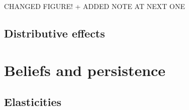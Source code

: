 \documentclass[12pt]{article} %
\providecommand{\DIFaddbegin}{} %
\providecommand{\DIFaddend}{} %
\newcommand{\DIFaddincludegraphics}[2][]{{\color{blue}\fbox{\DIFOincludegraphics[#1]{#2}}}} %
\DeclareRobustCommand{\DIFaddbegin}{\DIFOaddbegin \let\includegraphics\DIFaddincludegraphics} %
\DeclareRobustCommand{\DIFaddend}{\DIFOaddend \let\includegraphics\DIFOincludegraphics} %
\begin{document}
\begin{appendices}

\DIFaddbegin 

\DIFaddend CHANGED FIGURE! + ADDED NOTE AT NEXT ONE


\subsection{Distributive effects \label{subsec:app_distributive}}



\vspace{1cm}

\section{Beliefs and persistence\label{sec:app_perception}}

    \subsection{Elasticities}


\end{appendices}
\end{document}
